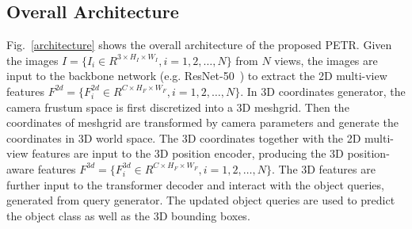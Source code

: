 \documentclass[runningheads]{llncs}
\begin{document}
\subsection{Overall Architecture}
Fig.~\ref{architecture} shows the overall architecture of the proposed PETR. Given the images $I=\{ I_i \in R^{3 \times H_I \times W_I}, i=1,2,\dots, N \}$ from $N$ views, the images are input to the backbone network (e.g. ResNet-50~\cite{he2016resnet}) to extract the 2D multi-view features  $F^{2d}=\{F^{2d}_i\in  R^{C \times H_F \times W_F}, i=1,2,\dots, N\}$. In 3D coordinates generator, the camera frustum space is first discretized into a 3D meshgrid. Then the coordinates of meshgrid are transformed by camera parameters and generate the coordinates in 3D world space. The 3D coordinates together with the 2D multi-view features are input to the 3D position encoder, producing the 3D position-aware features $F^{3d}=\{F^{3d}_i\in  R^{C \times H_F \times W_F}, i=1,2,\dots, N\}$. The 3D features are further input to the transformer decoder and interact with the object queries, generated from query generator. The updated object queries are used to predict the object class as well as the 3D bounding boxes.
\end{document}
